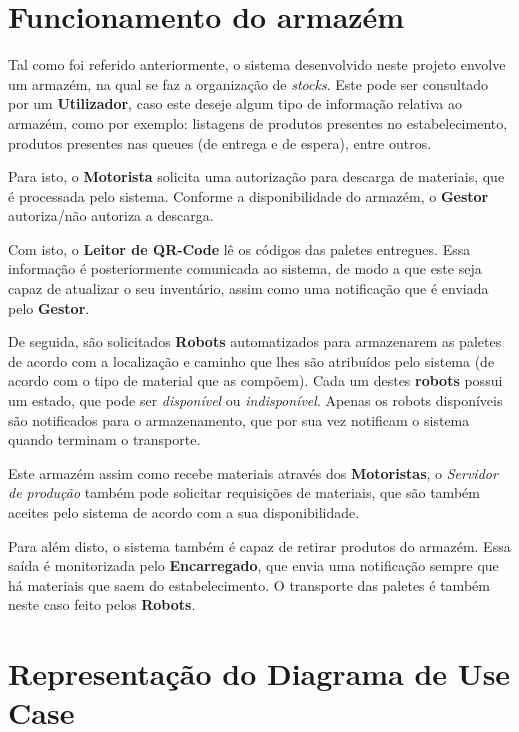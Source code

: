 \documentclass[a4paper]{report}
\begin{document}
\pagebreak

\section{Funcionamento do armazém}
Tal como foi referido anteriormente, o sistema desenvolvido neste projeto envolve um armazém, na qual se faz a organização de \textit{stocks}. Este pode ser consultado por um \textbf{Utilizador}, caso este deseje algum tipo de informação relativa ao armazém, como por exemplo: listagens de produtos presentes no estabelecimento, produtos presentes nas queues (de entrega e de espera), entre outros.

Para isto, o \textbf{Motorista} solicita uma autorização para descarga de materiais, que é processada pelo sistema. Conforme a disponibilidade do armazém, o \textbf{Gestor} autoriza/não autoriza a descarga.

Com isto, o \textbf{Leitor de QR-Code} lê os códigos das paletes entregues. Essa informação é posteriormente comunicada ao sistema, de modo a que este seja capaz de atualizar o seu inventário, assim como uma notificação que é enviada pelo \textbf{Gestor}.

De seguida, são solicitados \textbf{Robots} automatizados para armazenarem as paletes de acordo com a localização e caminho que lhes são atribuídos pelo sistema (de acordo com o tipo de material que as compõem). Cada um destes \textbf{robots} possui um estado, que pode ser \textit{disponível} ou \textit{indisponível}. Apenas os robots disponíveis são notificados para o armazenamento, que por sua vez notificam o sistema quando terminam o transporte.

Este armazém assim como recebe materiais através dos \textbf{Motoristas}, o \textit{Servidor de produção} também pode solicitar requisições de materiais, que são também aceites pelo sistema de acordo com a sua disponibilidade.

Para além disto, o sistema também é capaz de retirar produtos do armazém. Essa saída é monitorizada pelo \textbf{Encarregado}, que envia uma notificação sempre que há materiais que saem do estabelecimento. O transporte das paletes é também neste caso feito pelos \textbf{Robots}.


\newpage

\pagebreak
\section{Representação do Diagrama de Use Case}
\end{document}

